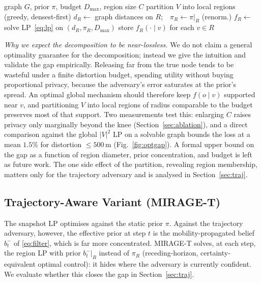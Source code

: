 \documentclass[10pt,journal,compsoc]{IEEEtran}
\begin{document}
\begin{algorithm}[t]
\caption{MIRAGE precompute (per graph, offline)}
\label{alg:mirage}
\begin{algorithmic}[1]
\REQUIRE graph $G$, prior $\pi$, budget $D_{\max}$, region size $C$
\STATE partition $V$ into local regions (greedy, densest-first)
  \STATE $d_R\leftarrow$ graph distances on $R$;\ \ $\pi_R\leftarrow\pi|_R$ (renorm.)
  \STATE $f_R\leftarrow$ solve LP~\eqref{eq:lp} on $(d_R,\pi_R,D_{\max})$
  \STATE store $f_R(\cdot\mid v)$ for each $v\in R$
\ENDFOR
\end{algorithmic}
\end{algorithm}

\emph{Why we expect the decomposition to be near-lossless.} We do not claim a
general optimality guarantee for the decomposition; instead we give the intuition
and validate the gap empirically. Releasing far from the true node tends to be
wasteful under a finite distortion budget, spending utility without buying
proportional privacy, because the adversary's error saturates at the prior's spread.
An optimal global mechanism should therefore keep $f(o\mid v)$ supported near $v$,
and partitioning $V$ into local regions of radius comparable to the budget preserves
most of that support. Two measurements test this: enlarging $C$ raises privacy only
marginally beyond the knee (Section~\ref{sec:ablation}), and a direct comparison
against the global $|V|^2$ LP on a solvable graph bounds the loss at a mean $1.5\%$
for distortion $\le 500$\,m (Fig.~\ref{fig:optgap}). A formal upper bound on the gap
as a function of region diameter, prior concentration, and budget is left as future
work. The one side effect of the partition, revealing region membership, matters
only for the trajectory adversary and is analysed in Section~\ref{sec:traj}.

\subsection{Trajectory-Aware Variant (MIRAGE-T)}
The snapshot LP optimises against the static prior $\pi$. Against the trajectory
adversary, however, the effective prior at step $t$ is the mobility-propagated
belief $b_t^-$ of \eqref{eq:filter}, which is far more concentrated. MIRAGE-T
solves, at each step, the region LP with prior $b_t^-|_R$ instead of $\pi_R$
(receding-horizon, certainty-equivalent optimal control): it hides where the
adversary is currently confident. We evaluate whether this closes the gap in
Section~\ref{sec:traj}.
\end{document}
